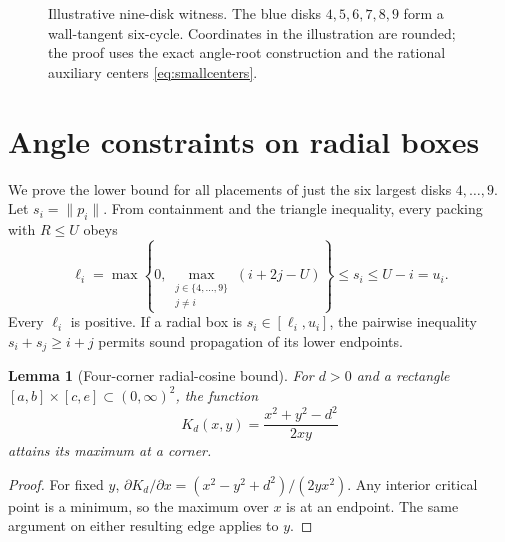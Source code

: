 \documentclass[11pt,a4paper]{article}
\newtheorem{lemma}[theorem]{Lemma}
\begin{document}
\begin{figure}[htbp]\centering
{}
\caption{Illustrative nine-disk witness. The blue disks $4,5,6,7,8,9$ form a wall-tangent six-cycle. Coordinates in the illustration are rounded; the proof uses the exact angle-root construction and the rational auxiliary centers \eqref{eq:smallcenters}.}\label{fig:witness}
\end{figure}

\section{Angle constraints on radial boxes}
We prove the lower bound for all placements of just the six largest disks $4,\ldots,9$. Let $s_i=\|p_i\|$. From containment and the triangle inequality, every packing with $R\le U$ obeys
\begin{equation}\label{eq:initialbox}
\ell_i=\max\left\{0,\max_{\substack{j\in\{4,\ldots,9\}\\j\ne i}}(i+2j-U)\right\}\le s_i\le U-i=u_i.
\end{equation}
Every $\ell_i$ is positive. If a radial box is $s_i\in[\ell_i,u_i]$, the pairwise inequality $s_i+s_j\ge i+j$ permits sound propagation of its lower endpoints.

\begin{lemma}[Four-corner radial-cosine bound]\label{lem:corner}
For $d>0$ and a rectangle $[a,b]\times[c,e]\subset(0,\infty)^2$, the function
\[
K_d(x,y)=\frac{x^2+y^2-d^2}{2xy}
\]
attains its maximum at a corner.
\end{lemma}
\begin{proof}
For fixed $y$, $\partial K_d/\partial x=(x^2-y^2+d^2)/(2yx^2)$. Any interior critical point is a minimum, so the maximum over $x$ is at an endpoint. The same argument on either resulting edge applies to $y$.
\end{proof}
\end{document}
